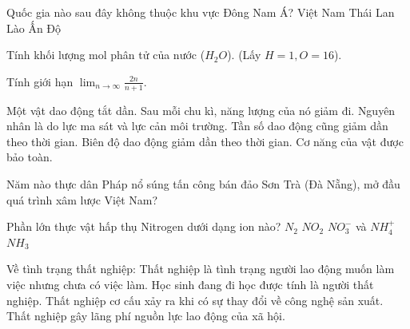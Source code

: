 \begin{ex}
    Quốc gia nào sau đây không thuộc khu vực Đông Nam Á?
    \choice
    {Việt Nam}
    {Thái Lan}
    {Lào}
    {\True Ấn Độ}
\end{ex}

\begin{ex}
    Tính khối lượng mol phân tử của nước ($H_2O$). (Lấy $H=1, O=16$).
\end{ex}

\begin{ex}
    Tính giới hạn $\lim_{n \to \infty} \frac{2n}{n+1}$.
\end{ex}

\begin{ex}
    Một vật dao động tắt dần. Sau mỗi chu kì, năng lượng của nó giảm đi.
    \choiceTF
    {\True Nguyên nhân là do lực ma sát và lực cản môi trường.}
    {Tần số dao động cũng giảm dần theo thời gian.}
    {\True Biên độ dao động giảm dần theo thời gian.}
    {Cơ năng của vật được bảo toàn.}
\end{ex}

\begin{ex}
    Năm nào thực dân Pháp nổ súng tấn công bán đảo Sơn Trà (Đà Nẵng), mở đầu quá trình xâm lược Việt Nam?
\end{ex}

\begin{ex}
    Phần lớn thực vật hấp thụ Nitrogen dưới dạng ion nào?
    \choice
    {$N_2$}
    {$NO_2$}
    {\True $NO_3^-$ và $NH_4^+$}
    {$NH_3$}
\end{ex}

\begin{ex}
    Về tình trạng thất nghiệp:
    \choiceTF
    {\True Thất nghiệp là tình trạng người lao động muốn làm việc nhưng chưa có việc làm.}
    {Học sinh đang đi học được tính là người thất nghiệp.}
    {\True Thất nghiệp cơ cấu xảy ra khi có sự thay đổi về công nghệ sản xuất.}
    {\True Thất nghiệp gây lãng phí nguồn lực lao động của xã hội.}
\end{ex}

